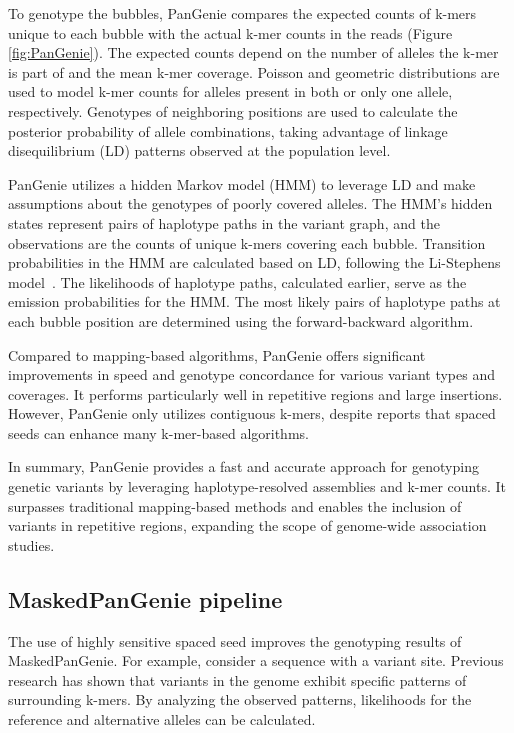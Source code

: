 \documentclass{PHlab-thesis}
\begin{document}
To genotype the bubbles, PanGenie compares the expected counts of k-mers unique to each bubble with the actual k-mer counts in the reads (Figure \ref{fig:PanGenie}). The expected counts depend on the number of alleles the k-mer is part of and the mean k-mer coverage. Poisson and geometric distributions are used to model k-mer counts for alleles present in both or only one allele, respectively. Genotypes of neighboring positions are used to calculate the posterior probability of allele combinations, taking advantage of linkage disequilibrium (LD) patterns observed at the population level.

PanGenie utilizes a hidden Markov model (HMM) to leverage LD and make assumptions about the genotypes of poorly covered alleles. The HMM's hidden states represent pairs of haplotype paths in the variant graph, and the observations are the counts of unique k-mers covering each bubble. Transition probabilities in the HMM are calculated based on LD, following the Li-Stephens model~\cite{Li2003linkage}. The likelihoods of haplotype paths, calculated earlier, serve as the emission probabilities for the HMM. The most likely pairs of haplotype paths at each bubble position are determined using the forward-backward algorithm.

Compared to mapping-based algorithms, PanGenie offers significant improvements in speed and genotype concordance for various variant types and coverages. It performs particularly well in repetitive regions and large insertions. However, PanGenie only utilizes contiguous k-mers, despite reports that spaced seeds can enhance many k-mer-based algorithms.

In summary, PanGenie provides a fast and accurate approach for genotyping genetic variants by leveraging haplotype-resolved assemblies and k-mer counts. It surpasses traditional mapping-based methods and enables the inclusion of variants in repetitive regions, expanding the scope of genome-wide association studies.
\subsection{MaskedPanGenie pipeline}
The use of highly sensitive spaced seed improves the genotyping results of MaskedPanGenie. For example, consider a sequence with a variant site. Previous research has shown that variants in the genome exhibit specific patterns of surrounding k-mers. By analyzing the observed patterns, likelihoods for the reference and alternative alleles can be calculated.
\end{document}
